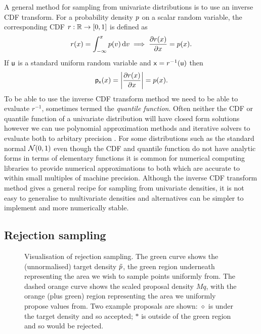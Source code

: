 
A general method for sampling from univariate distributions is to use an inverse \ac{CDF} transform. For a probability density $p$ on a scalar random variable, the corresponding \ac{CDF} $r : \mathbb{R} \to [0,1]$ is defined as
\begin{equation}
  r(x) = \int_{-\infty}^x p(v) \,\mathrm{d} v
  \implies
  \frac{\partial r(x)}{\partial x} = p(x).
\end{equation}
If $\mathsf{u}$ is a standard uniform random variable and $\mathsf{x} = r^{-1}(\mathsf{u})$ then
\begin{equation}
  \pden{\rvar{x}}(x) = \left|\pd{r(x)}{x}\right| = \tgtdens(x).
\end{equation}
To be able to use the inverse \ac{CDF} transform method we need to be able to evaluate $r^{-1}$, sometimes termed the \emph{quantile function}. Often neither the \ac{CDF} or quantile function of a univariate distribution will have closed form solutions however we can use polynomial approximation methods and iterative solvers to evaluate both to arbitary precision \citep{olver2013fast}. For some distributions such as the standard normal $\nrm{0,1}$ even though the \ac{CDF} and quantile function do not have analytic forms in terms of elementary functions it is common for numerical computing libraries to provide numerical approximations to both which are accurate to within small multiples of machine precision. Although the inverse \ac{CDF} transform method gives a general recipe for sampling from univariate densities, it is not easy to generalise to multivariate densities and alternatives can be simpler to implement and more numerically stable.

\subsection{Rejection sampling}

\begin{figure}[t]
\centering
{}
\caption[Visualisation of rejection sampling.]{Visualisation of rejection sampling. The green curve shows the (unnormalised) target density $\tilde{p}$, the green region underneath representing the area we wish to sample points uniformly from. The dashed orange curve shows the scaled proposal density $M q$, with the orange (plus green) region representing the area we uniformly propose values from. Two example proposals are shown: $\diamond$ is under the target density and so accepted; $*$ is outside of the green region and so would be rejected.}
\label{fig:rejection-sampling}
\end{figure}

